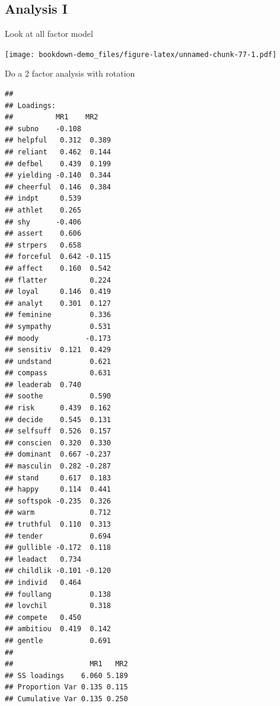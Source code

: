 \documentclass[]{book}
\newenvironment{Shaded}{\begin{snugshade}}{\end{snugshade}}
\newcommand{\KeywordTok}[1]{\textcolor[rgb]{0.13,0.29,0.53}{\textbf{#1}}}
\newcommand{\DataTypeTok}[1]{\textcolor[rgb]{0.13,0.29,0.53}{#1}}
\newcommand{\DecValTok}[1]{\textcolor[rgb]{0.00,0.00,0.81}{#1}}
\newcommand{\StringTok}[1]{\textcolor[rgb]{0.31,0.60,0.02}{#1}}
\newcommand{\OperatorTok}[1]{\textcolor[rgb]{0.81,0.36,0.00}{\textbf{#1}}}
\newcommand{\NormalTok}[1]{#1}
\theoremstyle{definition}
\theoremstyle{definition}
\theoremstyle{definition}
\theoremstyle{remark}
\begin{document}
\subsection{Analysis I}\label{analysis-i}

Look at all factor model

\begin{Shaded}
\end{Shaded}

\texttt{[image: bookdown-demo\_files/figure-latex/unnamed-chunk-77-1.pdf]}

Do a 2 factor analysis with rotation

\begin{Shaded}
\end{Shaded}

\begin{verbatim}
## 
## Loadings:
##          MR1    MR2   
## subno    -0.108       
## helpful   0.312  0.389
## reliant   0.462  0.144
## defbel    0.439  0.199
## yielding -0.140  0.344
## cheerful  0.146  0.384
## indpt     0.539       
## athlet    0.265       
## shy      -0.406       
## assert    0.606       
## strpers   0.658       
## forceful  0.642 -0.115
## affect    0.160  0.542
## flatter          0.224
## loyal     0.146  0.419
## analyt    0.301  0.127
## feminine         0.336
## sympathy         0.531
## moody           -0.173
## sensitiv  0.121  0.429
## undstand         0.621
## compass          0.631
## leaderab  0.740       
## soothe           0.590
## risk      0.439  0.162
## decide    0.545  0.131
## selfsuff  0.526  0.157
## conscien  0.320  0.330
## dominant  0.667 -0.237
## masculin  0.282 -0.287
## stand     0.617  0.183
## happy     0.114  0.441
## softspok -0.235  0.326
## warm             0.712
## truthful  0.110  0.313
## tender           0.694
## gullible -0.172  0.118
## leadact   0.734       
## childlik -0.101 -0.120
## individ   0.464       
## foullang         0.138
## lovchil          0.318
## compete   0.450       
## ambitiou  0.419  0.142
## gentle           0.691
## 
##                  MR1   MR2
## SS loadings    6.060 5.189
## Proportion Var 0.135 0.115
## Cumulative Var 0.135 0.250
\end{verbatim}
\end{document}
